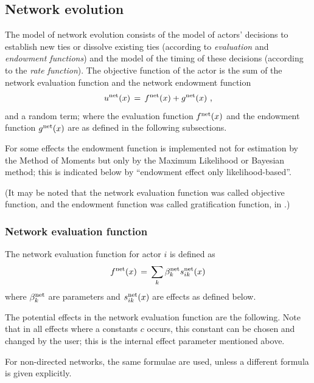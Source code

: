 \documentclass[a4paper,fleqn]{article}
\newcommand{\+}{\, + \,}
\begin{document}
{\subsection{Network evolution}
The model of network evolution consists of the model of actors'
decisions to establish new ties or dissolve existing ties
(according to {\it evaluation} and {\it endowment functions}) and the
model of the timing of these decisions (according to the {\it rate
function}).
The objective function of the actor is the sum of the
network evaluation
function and the network endowment function
\begin{equation}
u^{\rm net}(x) \, = \, f^{\rm net}(x) + g^{\rm net}(x)  \ , \label{u_net}
\end{equation}
and a random term; where the evaluation function $f^{\rm net}(x)$ and the endowment
function $g^{\rm net}(x)$ are as defined in the following subsections.

For some effects %
the endowment function is implemented not for estimation by the Method of Moments
but only by the Maximum Likelihood or Bayesian method;
this is indicated below by ``endowment effect only likelihood-based''.

(It may be noted that the network evaluation function was called objective function,
and the endowment function was called gratification function, in
\citet{Snijders01}.)

\subsubsection{Network evaluation function}
\label{S_f}

The network evaluation function for actor $i$ is defined as
\begin{equation}
f^{\rm net}(x) \, = \, \sum_k \beta^{\rm net}_k s^{\rm net}_{ik}(x)   \label{f_net}
\end{equation}
where $\beta^{\rm net}_k$ are parameters and $s^{\rm net}_{ik}(x)$
are effects as defined below.

The potential effects in the \hypertarget{T_objective}{network
evaluation function}
are the following. Note that in all
effects where a constants $c$ occurs, this constant can be chosen
and changed by the user;
this is the internal effect parameter mentioned above.

For non-directed networks, the same formulae are used,
unless a different formula is given explicitly.
\medskip

}
\end{document}
